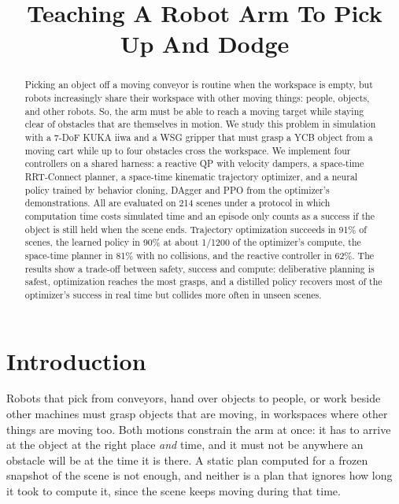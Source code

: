 \documentclass[conference]{IEEEtran}
\begin{document}
\title{Teaching A Robot Arm To Pick Up And Dodge}

\author{
}

\maketitle

\begin{abstract}
Picking an object off a moving conveyor is routine when the workspace is empty, but robots increasingly
share their workspace with other moving things: people, objects, and other robots. So, the arm must be able to reach a moving target while
staying clear of obstacles that are themselves in motion. We study this problem in simulation with a
7-DoF KUKA iiwa and a WSG gripper that must grasp a YCB object from a moving cart while up to four
obstacles cross the workspace. We implement four controllers on a shared harness: a reactive QP with
velocity dampers, a space-time RRT-Connect planner, a space-time kinematic trajectory optimizer, and a
neural policy trained by behavior cloning, DAgger and PPO from the optimizer's demonstrations. All are
evaluated on 214 scenes under a protocol in which computation time costs simulated time and an episode
only counts as a success if the object is still held when the scene ends. Trajectory optimization
succeeds in 91\% of scenes, the learned policy in 90\% at about 1/1200 of the optimizer's compute, the
space-time planner in 81\% with no collisions, and the reactive controller in 62\%. The results show a
trade-off between safety, success and compute: deliberative planning is safest, optimization reaches
the most grasps, and a distilled policy recovers most of the optimizer's success in real time but
collides more often in unseen scenes.
\end{abstract}

\section{Introduction}

Robots that pick from conveyors, hand over objects to people, or work beside other machines must grasp
objects that are moving, in workspaces where other things are moving too. Both motions constrain the
arm at once: it has to arrive at the object at the right place \emph{and} time, and it must not be
anywhere an obstacle will be at the time it is there. A static plan computed for a frozen snapshot of
the scene is not enough, and neither is a plan that ignores how long it took to compute it, since the
scene keeps moving during that time.
\end{document}
